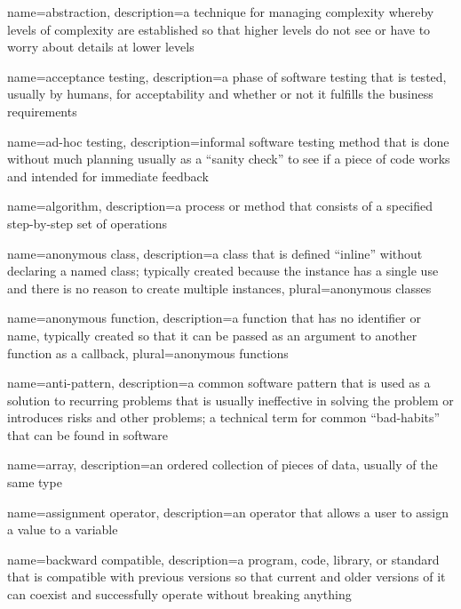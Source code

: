 
{
  name=abstraction,
  description={a technique for managing complexity whereby levels of complexity are established so that higher levels do not see or have to worry about details at lower levels}
}

{
  name=acceptance testing,
  description={a phase of software testing that is tested, usually by humans, for acceptability and whether or not it fulfills the business requirements}
}

{
  name=ad-hoc testing,
  description={informal software testing method that is done without much planning usually as a ``sanity check'' to see if a piece of code works and intended for immediate feedback}
}

{
  name=algorithm,
  description={a process or method that consists of a specified step-by-step set of operations}
}

{
  name=anonymous class,
  description={a class that is defined ``inline'' without declaring a named class; typically created because the instance has a single use and there is no reason to create multiple instances},
  plural=anonymous classes
}

{
  name=anonymous function,
  description={a function that has no identifier or name, typically created so that it can be passed as an argument to another function as a callback},
  plural=anonymous functions
}

{
  name=anti-pattern,
  description={a common software pattern that is used as a solution to recurring problems that is usually ineffective in solving the problem or introduces risks and other problems; a technical term for common ``bad-habits'' that can be found in software}
}

{
  name=array,
  description={an ordered collection of pieces of data, usually of the same type}
}

{
  name=assignment operator,
  description={an operator that allows a user to assign a value to a variable}
}

{
  name=backward compatible,
  description={a program, code, library, or standard that is compatible with previous versions so that current
  	and older versions of it can coexist and successfully operate without breaking anything}
}

